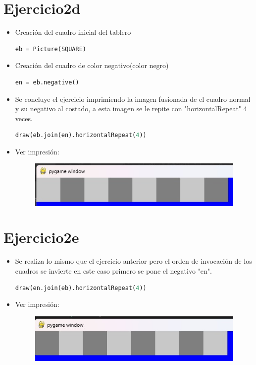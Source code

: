 \documentclass{article}
\begin{document}
	\section{Ejercicio2d}
\begin{itemize}   
    \item Creación del cuadro inicial del tablero
    \begin{lstlisting}[language=Python, caption={Creacion de un primer cuadro}, float=H]
	eb = Picture(SQUARE)
    \end{lstlisting}
    \item Creación del cuadro de color negativo(color negro)
    \begin{lstlisting}[language=Python, caption={Creacion de un primer cuadro negativo}, float=H]
	en = eb.negative()
    \end{lstlisting}
    \item Se concluye el ejercicio imprimiendo la imagen fusionada de el cuadro normal y su negativo al costado, a esta imagen se le repite con "horizontalRepeat" 4 veces.
    \begin{lstlisting}[language=Python, caption={Creacion e impresion de una fila}, float=H]
	draw(eb.join(en).horizontalRepeat(4))
    \end{lstlisting}
    \item Ver impresión:
    \begin{figure}[H]
		\centering
		\includegraphics[scale=0.3]{img/ejercicio2d.jpg}
	\end{figure}
\end{itemize}

\section{Ejercicio2e}
\begin{itemize}   
    \item Se realiza lo mismo que el ejercicio anterior pero el orden de invocación de los cuadros se invierte en este caso primero se pone el negativo "en".
    \begin{lstlisting}[language=Python, caption={Creacion e impresion de una fila con primer cuadro negativo}, float=H]
	draw(en.join(eb).horizontalRepeat(4))
    \end{lstlisting}
    \item Ver impresión:
    \begin{figure}[H]
		\centering
		\includegraphics[scale=0.3]{img/ejercicio2e.jpg}
	\end{figure}
\end{itemize}
\end{document}
